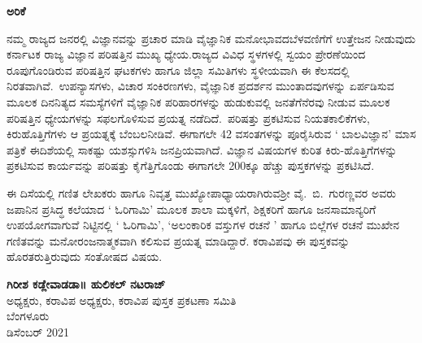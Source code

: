 


\vspace{-1.5cm}

\begin{center}
{\LARGE\textbf{{ಅರಿಕೆ }}}
\end{center}

\noindent
ನಮ್ಮ ರಾಜ್ಯದ ಜನರಲ್ಲಿ ವಿಜ್ಞಾನವನ್ನು ಪ್ರಚಾರ ಮಾಡಿ ವೈಜ್ಞಾನಿಕ ಮನೋಭಾವದ\break ಬೆಳವಣಿಗೆಗೆ ಉತ್ತೇಜನ ನೀಡುವುದು  ಕರ್ನಾಟಕ ರಾಜ್ಯ ವಿಜ್ಞಾನ ಪರಿಷತ್ತಿನ ಮುಖ್ಯ ಧ್ಯೇಯ.\break ರಾಜ್ಯದ ವಿವಿಧ ಸ್ಥಳಗಳಲ್ಲಿ ಸ್ವಯಂ ಪ್ರೇರಣೆಯಿಂದ ರೂಪುಗೊಂಡಿರುವ ಪರಿಷತ್ತಿನ  ಘಟಕ\break ಗಳು ಹಾಗೂ ಜಿಲ್ಲಾ ಸಮಿತಿಗಳು ಸ್ಥಳೀಯವಾಗಿ ಈ ಕೆಲಸದಲ್ಲಿ ನಿರತವಾಗಿವೆ.~ಉಪನ್ಯಾಸಗಳು, ವಿಚಾರ ಸಂಕಿರಣಗಳು, ವೈಜ್ಞಾನಿಕ ಪ್ರದರ್ಶನ ಮುಂತಾದವುಗಳನ್ನು ಏರ್ಪಡಿಸುವ ಮೂಲಕ ದಿನನಿತ್ಯದ ಸಮಸ್ಯೆಗಳಿಗೆ ವೈಜ್ಞಾನಿಕ ಪರಿಹಾರಗಳನ್ನು ಹುಡುಕುವಲ್ಲಿ ಜನತೆಗೆ\break ನೆರವು ನೀಡುವ ಮೂಲಕ ಪರಿಷತ್ತಿನ ಧ್ಯೇಯಗಳನ್ನು ಸಫಲಗೊಳಿಸುವ ಪ್ರಯತ್ನ ನಡೆದಿದೆ.\break~ಪರಿಷತ್ತು ಪ್ರಕಟಿಸುವ ನಿಯತಕಾಲಿಕೆಗಳು, ಕಿರುಹೊತ್ತಿಗೆಗಳು ಆ ಪ್ರಯತ್ನಕ್ಕೆ ಬೆಂಬಲ\break ನೀಡಿವೆ. ಈಗಾಗಲೇ 42 ವಸಂತಗಳನ್ನು ಪೂರೈಸಿರುವ ` ಬಾಲವಿಜ್ಞಾನ' ಮಾಸ ಪತ್ರಿಕೆ ಈ\break ದಿಶೆಯಲ್ಲಿ ಸಾಕಷ್ಟು ಯಶಸ್ಸುಗಳಿಸಿ ಜನಪ್ರಿಯವಾಗಿದೆ. ವಿಜ್ಞಾನ ವಿಷಯಗಳ ಕುರಿತ ಕಿರು-\break ಹೊತ್ತಿಗೆಗಳನ್ನು ಪ್ರಕಟಿಸುವ ಕಾರ್ಯವನ್ನು ಪರಿಷತ್ತು ಕೈಗೆತ್ತಿಗೊಂಡು ಈಗಾಗಲೇ 200ಕ್ಕೂ ಹೆಚ್ಚು ಪುಸ್ತಕಗಳನ್ನು ಪ್ರಕಟಿಸಿದೆ.

\noindent
ಈ ದಿಸೆಯಲ್ಲಿ ಗಣಿತ ಲೇಖಕರು ಹಾಗೂ ನಿವೃತ್ತ ಮುಖ್ಯೋಪಾಧ್ಯಾಯರಾಗಿರುವ\break ಶ್ರೀ ವೈ.~ಬಿ.~ಗುರಣ್ಣವರ ಅವರು ಜಪಾನಿನ ಪ್ರಸಿದ್ಧ ಕಲೆಯಾದ ` ಓರಿಗಾಮಿ' ಮೂಲಕ ಶಾಲಾ ಮಕ್ಕಳಿಗೆ, ಶಿಕ್ಷಕರಿಗೆ ಹಾಗೂ ಜನಸಾಮಾನ್ಯರಿಗೆ ಉಪಯೋಗವಾಗುವೆ ನಿಟ್ಟಿನಲ್ಲಿ ` ಓರಿಗಾಮಿ', `ಅಲಂಕಾರಿಕ ವಸ್ತುಗಳ ರಚನೆ ' ಹಾಗೂ ಬಿಲ್ಲೆಗಳ ರಚನೆ ಮುಖೇನ ಗಣಿತವನ್ನು ಮನೋರಂಜನಾತ್ಮಕವಾಗಿ ಕಲಿಸುವ ಪ್ರಯತ್ನ ಮಾಡಿದ್ದಾರೆ. ಕರಾವಿಪವು ಈ ಪುಸ್ತಕವನ್ನು ಹೊರತರುತ್ತಿರುವುದು ಸಂತೋಷದ ವಿಷಯ. 

\noindent
\textbf{ಗಿರೀಶ ಕಡ್ಲೇವಾಡ\hfill ಡಾ॥ ಹುಲಿಕಲ್ ನಟರಾಜ್\\[-.1cm]}
ಅಧ್ಯಕ್ಷರು, ಕರಾವಿಪ \hfill ಅಧ್ಯಕ್ಷರು, ಕರಾವಿಪ ಪುಸ್ತಕ ಪ್ರಕಟಣಾ ಸಮಿತಿ\\[.1cm] 
ಬೆಂಗಳೂರು \\
ಡಿಸೆಂಬರ್ 2021

